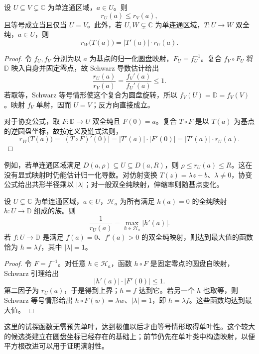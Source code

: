 \begin{proposition}[共形半径的单调性与协变性]\label{b3:prop:05-radius-monotonicity}
设 \(U\subseteq V\subsetneq\mathbb C\) 为单连通区域，\(a\in U\)。则
\[
 r_U(a)\le r_V(a),
\]
且等号成立当且仅当 \(U=V\)。此外，若 \(U,W\subsetneq\mathbb C\) 为单连通区域，\(T:U\rightarrow W\) 双全纯，\(a\in U\)，则
\[
 r_W\bigl(T(a)\bigr)=|T'(a)|\cdot r_U(a).
\]
\end{proposition}
\begin{proof}
令 \(f_U,f_V\) 分别为以 \(a\) 为基点的归一化圆盘映射，\(F_U=f_U^{-1}\)。复合 \(f_V\circ F_U\) 将 \(\mathbb D\) 映入自身并固定零点，故 Schwarz 导数估计给出
\[
 \frac{r_U(a)}{r_V(a)}
 =\frac{f_V'(a)}{f_U'(a)}\le1.
\]
若取等，Schwarz 等号情形使这个复合为圆盘旋转，所以 \(f_V(U)=\mathbb D=f_V(V)\)。映射 \(f_V\) 单射，因而 \(U=V\)；反方向直接成立。

对于协变公式，取 \(F:\mathbb D\rightarrow U\) 双全纯且 \(F(0)=a\)。复合 \(T\circ F\) 是以 \(T(a)\) 为基点的逆圆盘坐标，故按定义及链式法则，
\[
 r_W\bigl(T(a)\bigr)
 =|(T\circ F)'(0)|
 =|T'(a)|\cdot|F'(0)|
 =|T'(a)|\cdot r_U(a).
\]
\end{proof}

例如，若单连通区域满足 \(D(a,\rho)\subseteq U\subseteq D(a,R)\)，则 \(\rho\le r_U(a)\le R\)。这在没有显式映射时仍能估计归一化导数。对仿射变换 \(T(z)=\lambda z+b\)、\(\lambda\ne0\)，协变公式给出共形半径乘以 \(|\lambda|\)；对一般双全纯映射，伸缩率则随基点变化。

\begin{proposition}[共形半径的函数极值]\label{b3:prop:05-radius-extremal}
设 \(U\subsetneq\mathbb C\) 为单连通区域，\(a\in U\)，\(\mathcal H_a\) 为所有满足 \(h(a)=0\) 的全纯映射 \(h:U\rightarrow\mathbb D\) 组成的族。则
\[
 \frac1{r_U(a)}=\max_{h\in\mathcal H_a}|h'(a)|.
\]
若 \(f:U\rightarrow\mathbb D\) 是满足 \(f(a)=0\)、\(f'(a)>0\) 的双全纯映射，则达到最大值的函数恰为 \(h=\lambda f\)，其中 \(|\lambda|=1\)。
\end{proposition}
\begin{proof}
令 \(F=f^{-1}\)。对任意 \(h\in\mathcal H_a\)，函数 \(h\circ F\) 是固定零点的圆盘自映射，Schwarz 引理给出
\[
 |h'(a)|\cdot|F'(0)|\le1.
\]
第二因子为 \(r_U(a)\)，于是得到上界；\(h=f\) 达到它。若另一个 \(h\) 也取等，则 Schwarz 等号情形给出 \(h\circ F(w)=\lambda w\)、\(|\lambda|=1\)，即 \(h=\lambda f\)。这些函数均达到最大值。
\end{proof}

这里的试探函数无需预先单叶，达到极值以后才由等号情形取得单叶性。这个较大的候选类建立在圆盘坐标已经存在的基础上；前节仍先在单叶类中构造映射，以便平方根改进可以用于证明满射性。

